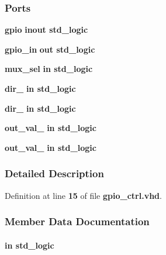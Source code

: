 \subsubsection*{Ports}
 \begin{DoxyCompactItemize}
\item 
{\bf gpio}  {\bfseries {\bfseries \textcolor{keywordflow}{inout}\textcolor{vhdlchar}{ }}} {\bfseries \textcolor{comment}{std\+\_\+logic}\textcolor{vhdlchar}{ }} 
\item 
{\bf gpio\+\_\+in}  {\bfseries {\bfseries \textcolor{keywordflow}{out}\textcolor{vhdlchar}{ }}} {\bfseries \textcolor{comment}{std\+\_\+logic}\textcolor{vhdlchar}{ }} 
\item 
{\bf mux\+\_\+sel}  {\bfseries {\bfseries \textcolor{keywordflow}{in}\textcolor{vhdlchar}{ }}} {\bfseries \textcolor{comment}{std\+\_\+logic}\textcolor{vhdlchar}{ }} 
\item 
{\bf dir\+\_}  {\bfseries {\bfseries \textcolor{keywordflow}{in}\textcolor{vhdlchar}{ }}} {\bfseries \textcolor{comment}{std\+\_\+logic}\textcolor{vhdlchar}{ }} 
\item 
{\bf dir\+\_}  {\bfseries {\bfseries \textcolor{keywordflow}{in}\textcolor{vhdlchar}{ }}} {\bfseries \textcolor{comment}{std\+\_\+logic}\textcolor{vhdlchar}{ }} 
\item 
{\bf out\+\_\+val\+\_}  {\bfseries {\bfseries \textcolor{keywordflow}{in}\textcolor{vhdlchar}{ }}} {\bfseries \textcolor{comment}{std\+\_\+logic}\textcolor{vhdlchar}{ }} 
\item 
{\bf out\+\_\+val\+\_}  {\bfseries {\bfseries \textcolor{keywordflow}{in}\textcolor{vhdlchar}{ }}} {\bfseries \textcolor{comment}{std\+\_\+logic}\textcolor{vhdlchar}{ }} 
\end{DoxyCompactItemize}


\subsubsection{Detailed Description}


Definition at line {\bf 15} of file {\bf gpio\+\_\+ctrl.\+vhd}.



\subsubsection{Member Data Documentation}
\paragraph[{dir\+\_\+0}]{ {\bfseries \textcolor{keywordflow}{in}\textcolor{vhdlchar}{ }} {\bfseries \textcolor{comment}{std\+\_\+logic}\textcolor{vhdlchar}{ }} \hspace{0.3cm}{\ttfamily [Port]}}\label{classgpio__ctrl_ae3b5a99d7c6c512dbc44aa882ed2a3e8}


